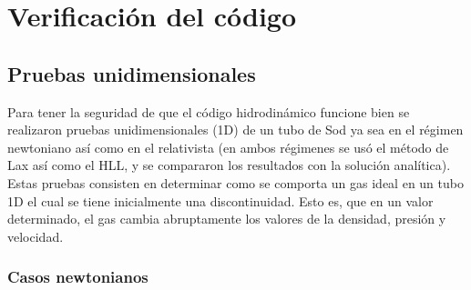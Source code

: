 \documentclass[12pt,a4paper]{book}
\begin{document}

\chapter{Verificación del código}\label{cap:Verificacion_del_codigo}


\section{Pruebas unidimensionales}

Para tener la seguridad de que el código hidrodinámico funcione bien se realizaron pruebas 
unidimensionales (1D)
de un tubo de Sod ya sea en el régimen newtoniano así como en el relativista (en ambos régimenes se usó
el método de Lax así como el HLL, y se compararon los resultados con la solución analítica). 
Estas pruebas consisten en determinar como se comporta un gas ideal en un tubo 1D 
el cual se tiene inicialmente una discontinuidad. Esto es, que en un valor determinado,
el gas cambia abruptamente los valores de la densidad, presión y velocidad.




\subsection{Casos newtonianos}
\end{document}
